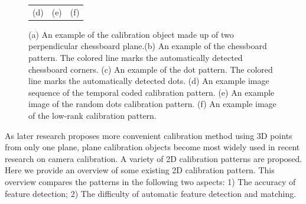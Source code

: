 \documentclass{report}
\begin{document}
\begin{savenotes}
\begin{figure}
\begin{tabular}{ccc}
(d) & (e) & (f)
\end{tabular}
\caption{(a) An example of the calibration object made up of two perpendicular chessboard plane.\protect\footnotemark[1] (b) An example of the chessboard pattern. The colored line marks the automatically detected chessboard corners. \protect\footnotemark[2] (c) An example of the dot pattern. The colored line marks the automatically detected dots. \protect\footnotemark[3] (d) An example image sequence of the temporal coded calibration pattern. \protect\footnotemark[4] (e) An example image of the random dots calibration pattern. \protect\footnotemark[5] (f) An example image of the low-rank calibration pattern. \protect\footnotemark[6]}
\label{calibPattFig}
\end{figure}
\end{savenotes}
As later research \cite{tsai1987versatile, zhang2000flexible} proposes more convenient calibration method using 3D points from only one plane, plane calibration objects become most widely used in recent research on camera calibration. A variety of 2D calibration patterns are proposed. Here we provide an overview of some existing 2D calibration pattern. This overview compares the patterns in the following two aspects: 1) The accuracy of feature detection; 2) The difficulty of automatic feature detection and matching. 
\end{document}
